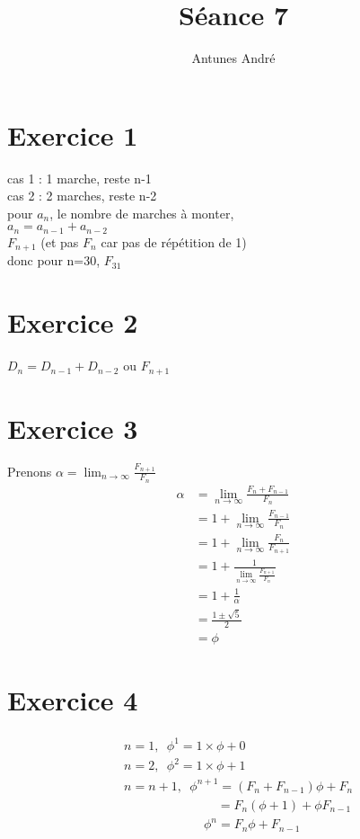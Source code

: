 \documentclass[fontsize=10pt]{article}
\title{\textbf{Séance 7}}
\author{Antunes André}
\date{}
\newcommand\tab[1][1cm]{\hspace*{#1}}
\begin{document}
\maketitle %

\section*{Exercice 1}

cas 1 : 1 marche, reste n-1 \\
cas 2 : 2 marches, reste n-2 \\
\tab pour $a_{n}$, le nombre de marches à monter, \\
\tab \tab $a_{n} = a_{n-1}+a_{n-2}$ \\
\tab \tab $F_{n+1}$ (et pas $F_{n}$ car pas de répétition de 1)\\
\tab \tab donc pour n=30, $F_{31}$

\section*{Exercice 2}
\tab \tab $D_{n} = D_{n-1}+D_{n-2}$ ou $F_{n+1}$ \\

\section*{Exercice 3}
Prenons $\alpha = \lim_{n\to\infty} \frac{F_{n+1}}{F_n}$
\begin{align*}
\alpha &= \lim_{n\to\infty} \frac{F_n + F_{n-1}}{F_n}\\
&= 1 + \lim_{n\to\infty} \frac{F_{n-1}}{F_n}\\
&= 1 + \lim_{n\to\infty} \frac{F_{n}}{F_{n+1}}\\
&= 1 + \frac{1}{\lim_{n\to\infty} \frac{F_{n+1}}{F_{n}}}\\
&= 1 + \frac{1}{\alpha}\\
&= \frac{1 \pm \sqrt{5}}{2}\\
&= \phi
\end{align*}
 
\section*{Exercice 4}
\begin{align*}
& n=1, \phantom{a}\phi^1 = 1 \times \phi + 0\\
& n=2, \phantom{a}\phi^2 = 1 \times \phi + 1\\
& n=n+1, \phantom{a}\phi^{n+1} = (F_n + F_{n-1})\phi + F_n\\
& \phantom{aaaaaaaaaaaaaa}= F_n (\phi + 1) + \phi F_{n-1}\\
& \phantom{aaaaaaaaaaaa}\phi^n = F_n\phi + F_{n-1}
\end{align*}
\end{document}
